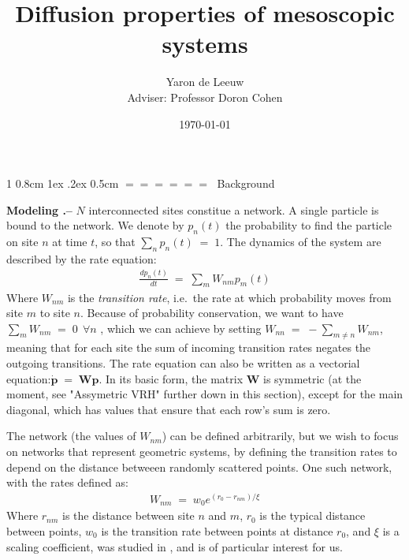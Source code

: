 \documentclass[onecolumn,fleqn,notitlepage,secnumarabic]{revtex4}
\makeatletter
\def\section{%
  \@startsection
    {section}%
    {1}%
    {\z@}%
    {0.8cm \@plus1ex \@minus .2ex}%
    {0.5cm}%
    {\Large\bf $=\!=\!=\!=\!=\!=\;$}%
}%
\makeatother
\begin{document}
\title{Diffusion properties of mesoscopic systems}

\author{Yaron de Leeuw \\ Adviser: Professor Doron Cohen}
\date{\today}
\maketitle


\section{Background}


{ \bf Modeling .-- } $N$ interconnected sites constitue a network. A single particle is bound to the network. We denote by $p_n(t)$ the probability to find the particle on site $n$ at time $t$, so that $\sum_n p_n(t) \;=\;1$. The dynamics of the system are described by the rate equation:
\begin{align}
\frac{dp_n(t)}{dt} \;=\; \sum_m W_{nm}p_m(t)
\end{align}
Where $W_{nm}$ is the \emph{transition rate}, i.e.\ the rate at which probability moves from site $m$ to site $n$.
Because of probability conservation, we want to have $\sum_m W_{nm} \;=\; 0 \ \ \forall n$ , which we can achieve by setting $W_{nn} \;=\; -\sum_{m\ne n} W_{nm} $, meaning that for each site the sum of incoming transition rates negates the outgoing transitions.
The rate equation can also be written as a vectorial equation:$\boldsymbol{ \dot p } \;=\; \boldsymbol{W} \boldsymbol{p}$. In its basic form, the matrix $\boldsymbol{W}$ is symmetric (at the moment, see "Assymetric VRH" further down in this section), except for the main diagonal, which has values that ensure that each row's sum is zero.

The network (the values of $W_{nm}$) can be defined arbitrarily, but we wish to focus on networks that represent geometric systems, by defining the transition rates to depend on the distance betweeen randomly scattered points\cite{Mezard:1999:NPB}. One such network, with the rates defined as:
\begin{align} \label{eq:exp_rates}
  W_{nm}\;=\; w_0 e^{(r_0-r_{nm})/ \xi}
\end{align}
Where $r_{nm}$ is the distance between site $n$ and $m$, $r_0$ is the typical distance between points, $w_0$ is the transition rate between points at distance $r_0$, and $\xi$ is a scaling coefficient, was studied in \cite{Amir:2010:PRL}, and is of particular interest for us.
\end{document}
